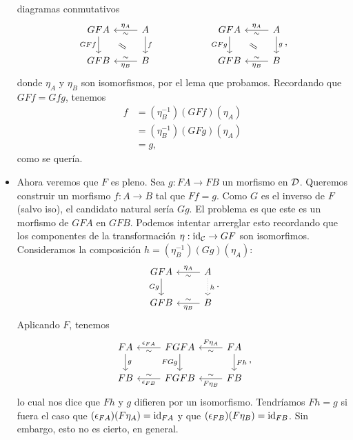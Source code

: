\begin{sol}
\begin{itemize}
        diagramas conmutativos
        \[
        \begin{tikzcd}
            GFA \ar[d,"GFf"'] & A \ar[l,"\eta_A"',"\sim"] \ar[d,"f"] \\
            GFB & B \ar[l,"\eta_B","\sim"']
            \com{1-1}{2-2}
        \end{tikzcd}
        \hspace{20mm}
        \begin{tikzcd}
            GFA \ar[d,"GFg"'] & A \ar[l,"\eta_A"',"\sim"] \ar[d,"g"] \\
            GFB & B \ar[l,"\eta_B","\sim"']
            \com{1-1}{2-2}
        \end{tikzcd}
        ,\]
        donde $\eta_A$ y $\eta_B$ son isomorfismos, por el lema que probamos.
        Recordando que $GFf=Gfg$, tenemos
        \begin{align*}
            f
            &= (\eta_B^{-1})(GFf)(\eta_A) \\
            &= (\eta_B^{-1})(GFg)(\eta_A) \\
            &= g,
        \end{align*}
        como se quería.
        
        \item
        Ahora veremos que $F$ es pleno.
        Sea $g:FA\to FB$ un morfismo en $\cal D$.
        Queremos construir un morfismo $f:A\to B$ tal que $Ff=g$.
        Como $G$ es el inverso de $F$ (salvo iso),
        el candidato natural sería $Gg$.
        El problema es que este es un
        morfismo de $GFA$ en $GFB$.
        Podemos intentar arrerglar esto recordando que los componentes de
        la transformación $\eta:\id_{\cal C} \to GF$ son isomorfimos.
        Consideramos la composición $h=(\eta_B^{-1})(Gg)(\eta_A)$:
        \[
        \begin{tikzcd}
            GFA \ar[d,"Gg"'] & A \ar[l,"\eta_A"',"\sim"] 
            \ar[d,"h",dotted]\\
            GFB & B \ar[l,"\eta_B","\sim"']
        \end{tikzcd}
        .\]
        Aplicando $F$, tenemos
        \[
        \begin{tikzcd}
            FA \ar[d,"g"]
                & \ar[l,"\epsilon_{FA}"',"\sim"] FGFA \ar[d,"FGg"']
                & FA \ar[l,"F\eta_A"',"\sim"]  \ar[d,"Fh"]\\
            FB  & FGFB \ar[l,"\epsilon_{FB}","\sim"']
                & FB \ar[l,"F\eta_B","\sim"']
        \end{tikzcd}
        ,\]
        lo cual nos dice que $Fh$ y $g$ difieren por un isomorfismo.
        Tendríamos $Fh=g$ si fuera el caso que
        $(\epsilon_{FA})(F\eta_A)=\id_{FA}$
        y que $(\epsilon_{FB})(F\eta_B)=\id_{FB}$.
        Sin embargo, esto no es cierto, en general.
        

\end{itemize}
\end{sol}
